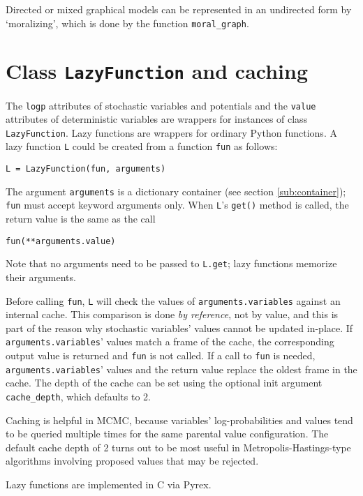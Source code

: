 Directed or mixed graphical models can be represented in an undirected form by `moralizing', which is done by the function \texttt{moral_graph}.


\section*{Class \texttt{LazyFunction} and caching}
\label{sec:caching} 

The \texttt{logp} attributes of stochastic variables and potentials and the \texttt{value} attributes of deterministic variables are wrappers for instances of class \texttt{LazyFunction}. Lazy functions are wrappers for ordinary Python functions. A lazy function \texttt{L} could be created from a function \texttt{fun} as follows:
\begin{verbatim}
L = LazyFunction(fun, arguments)
\end{verbatim}
The argument \texttt{arguments} is a dictionary container (see section \ref{sub:container}); \texttt{fun} must accept keyword arguments only. When \texttt{L}'s \texttt{get()} method is called, the return value is the same as the call 
\begin{verbatim}
fun(**arguments.value)
\end{verbatim}
Note that no arguments need to be passed to \texttt{L.get}; lazy functions memorize their arguments.

Before calling \texttt{fun}, \texttt{L} will check the values of \texttt{arguments.variables} against an internal cache. This comparison is done \emph{by reference}, not by value, and this is part of the reason why stochastic variables' values cannot be updated in-place. If \texttt{arguments.variables}' values match a frame of the cache, the corresponding output value is returned and \texttt{fun} is not called. If a call to \texttt{fun} is needed, \texttt{arguments.variables}' values and the return value replace the oldest frame in the cache. The depth of the cache can be set using the optional init argument \texttt{cache_depth}, which defaults to 2.

Caching is helpful in MCMC, because variables' log-probabilities and values tend to be queried multiple times for the same parental value configuration. The default cache depth of 2 turns out to be most useful in Metropolis-Hastings-type algorithms involving proposed values that may be rejected.

Lazy functions are implemented in C via Pyrex.